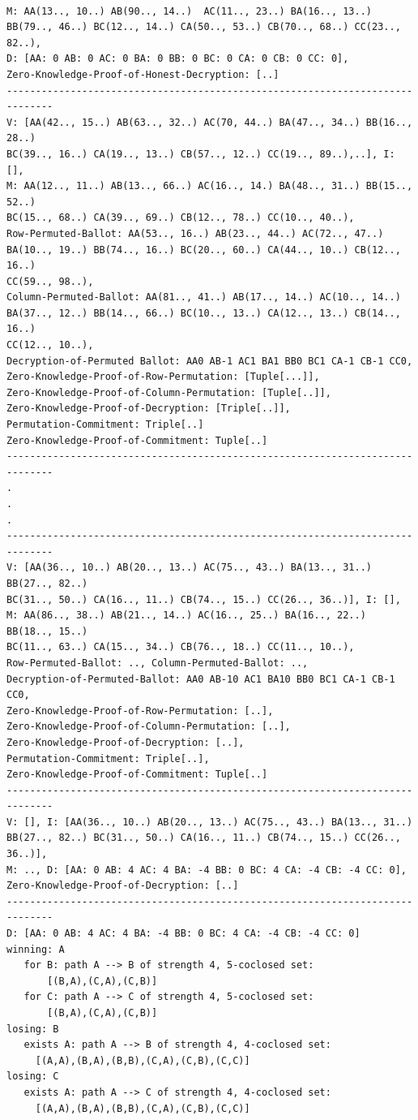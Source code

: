 \begin{lstlisting}[frame=none, numbers=none, basicstyle=\ttfamily\scriptsize]

M: AA(13.., 10..) AB(90.., 14..)  AC(11.., 23..) BA(16.., 13..) 
BB(79.., 46..) BC(12.., 14..) CA(50.., 53..) CB(70.., 68..) CC(23.., 82..), 
D: [AA: 0 AB: 0 AC: 0 BA: 0 BB: 0 BC: 0 CA: 0 CB: 0 CC: 0], 
Zero-Knowledge-Proof-of-Honest-Decryption: [..]
------------------------------------------------------------------------------
V: [AA(42.., 15..) AB(63.., 32..) AC(70, 44..) BA(47.., 34..) BB(16.., 28..)
BC(39.., 16..) CA(19.., 13..) CB(57.., 12..) CC(19.., 89..),..], I:  [], 
M: AA(12.., 11..) AB(13.., 66..) AC(16.., 14.) BA(48.., 31..) BB(15.., 52..)
BC(15.., 68..) CA(39.., 69..) CB(12.., 78..) CC(10.., 40..),
Row-Permuted-Ballot: AA(53.., 16..) AB(23.., 44..) AC(72.., 47..) 
BA(10.., 19..) BB(74.., 16..) BC(20.., 60..) CA(44.., 10..) CB(12.., 16..)
CC(59.., 98..),
Column-Permuted-Ballot: AA(81.., 41..) AB(17.., 14..) AC(10.., 14..) 
BA(37.., 12..) BB(14.., 66..) BC(10.., 13..) CA(12.., 13..) CB(14.., 16..)
CC(12.., 10..),
Decryption-of-Permuted Ballot: AA0 AB-1 AC1 BA1 BB0 BC1 CA-1 CB-1 CC0,
Zero-Knowledge-Proof-of-Row-Permutation: [Tuple[...]], 
Zero-Knowledge-Proof-of-Column-Permutation: [Tuple[..]], 
Zero-Knowledge-Proof-of-Decryption: [Triple[..]], 
Permutation-Commitment: Triple[..]
Zero-Knowledge-Proof-of-Commitment: Tuple[..]
------------------------------------------------------------------------------
.
.
.
------------------------------------------------------------------------------
V: [AA(36.., 10..) AB(20.., 13..) AC(75.., 43..) BA(13.., 31..) BB(27.., 82..)
BC(31.., 50..) CA(16.., 11..) CB(74.., 15..) CC(26.., 36..)], I: [],
M: AA(86.., 38..) AB(21.., 14..) AC(16.., 25..) BA(16.., 22..) BB(18.., 15..)
BC(11.., 63..) CA(15.., 34..) CB(76.., 18..) CC(11.., 10..), 
Row-Permuted-Ballot: .., Column-Permuted-Ballot: .., 
Decryption-of-Permuted-Ballot: AA0 AB-10 AC1 BA10 BB0 BC1 CA-1 CB-1 CC0,
Zero-Knowledge-Proof-of-Row-Permutation: [..],
Zero-Knowledge-Proof-of-Column-Permutation: [..], 
Zero-Knowledge-Proof-of-Decryption: [..], 
Permutation-Commitment: Triple[..], 
Zero-Knowledge-Proof-of-Commitment: Tuple[..]
------------------------------------------------------------------------------
V: [], I: [AA(36.., 10..) AB(20.., 13..) AC(75.., 43..) BA(13.., 31..) 
BB(27.., 82..) BC(31.., 50..) CA(16.., 11..) CB(74.., 15..) CC(26.., 36..)], 
M: .., D: [AA: 0 AB: 4 AC: 4 BA: -4 BB: 0 BC: 4 CA: -4 CB: -4 CC: 0],
Zero-Knowledge-Proof-of-Decryption: [..]
------------------------------------------------------------------------------
D: [AA: 0 AB: 4 AC: 4 BA: -4 BB: 0 BC: 4 CA: -4 CB: -4 CC: 0]
winning: A
   for B: path A --> B of strength 4, 5-coclosed set: 
       [(B,A),(C,A),(C,B)]
   for C: path A --> C of strength 4, 5-coclosed set:
       [(B,A),(C,A),(C,B)] 
losing: B
   exists A: path A --> B of strength 4, 4-coclosed set: 
     [(A,A),(B,A),(B,B),(C,A),(C,B),(C,C)]
losing: C
   exists A: path A --> C of strength 4, 4-coclosed set: 
     [(A,A),(B,A),(B,B),(C,A),(C,B),(C,C)]

\end{lstlisting}


